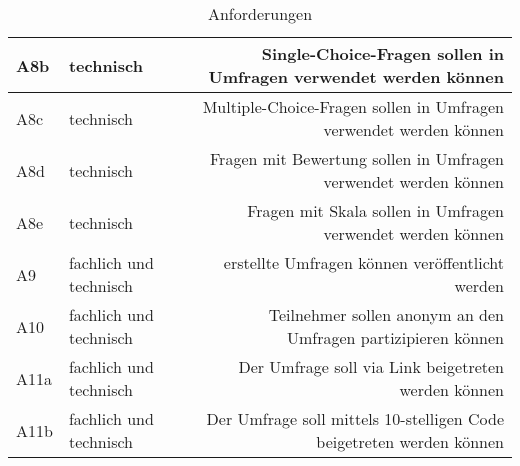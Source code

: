 \begin{table}[!htbp]
\begin{tabularx}{\textwidth}{|l|k|r|}
      \hline
      {\label{Anf:A8b}A8b} & technisch & Single-Choice-Fragen sollen in Umfragen verwendet werden können \\
      \hline
      {\label{Anf:A8c}A8c} & technisch & Multiple-Choice-Fragen sollen in Umfragen verwendet werden können \\
      \hline
      {\label{Anf:A8d}A8d} & technisch & Fragen mit Bewertung sollen in Umfragen verwendet werden können \\
      \hline
      {\label{Anf:A8e}A8e} & technisch & Fragen mit Skala sollen in Umfragen verwendet werden können \\
      \hline
      {\label{Anf:A9}A9} & fachlich und technisch & erstellte Umfragen können veröffentlicht werden \\
      \hline
      {\label{Anf:A10}A10} & fachlich und technisch & Teilnehmer sollen anonym an den Umfragen partizipieren können \\
      \hline
      {\label{Anf:A11a}A11a} & fachlich und technisch & Der Umfrage soll via Link beigetreten werden können \\
      \hline
      {\label{Anf:A11b}A11b} & fachlich und technisch & Der Umfrage soll mittels 10-stelligen Code beigetreten werden können \\
      \bottomrule
    \end{tabularx}
    \caption{Anforderungen}
    \label{tab:Anforderungen}
\end{table}